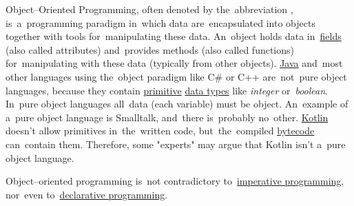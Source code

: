 \label{objectorientedprogramming}

Object--Oriented Programming, often denoted by the~abbreviation , is~a~programming paradigm in~which data are~encapsulated into objects together with tools for~manipulating these data.
An~object holds data in~\hyperref[variablefieldproperty]{fields} (also called attributes) and~provides methods (also called functions) for~manipulating with these data (typically from other objects).
\hyperref[java]{Java} and~most other languages using the~object paradigm like C\# or C++ are~not~pure object languages, because they contain \hyperref[javaprimitivetypes]{primitive} \hyperref[datatypes]{data types} like \textit{integer} or~\textit{boolean}.
In~pure object languages all~data (each variable) must be object.
An~example of a~pure object language is Smalltalk, and~there is~probably no~other.
\hyperref[kotlin]{Kotlin} doesn't allow primitives in~the~written code, but~the~compiled \hyperref[javabytecode]{bytecode} can~contain them.
Therefore, some "experts" may argue that Kotlin isn't a~pure object language.

\warning Object--oriented programming is~not contradictory to~\hyperref[imperativeprogramming]{imperative programming}, nor~even to~\hyperref[declarativeprogramming]{declarative programming}.

